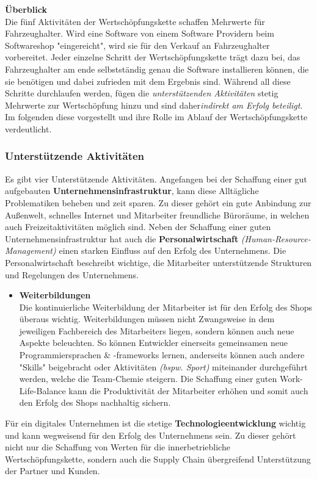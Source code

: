 \textbf{Überblick}\\
Die fünf Aktivitäten der Wertschöpfungskette schaffen Mehrwerte für Fahrzeughalter. Wird eine Software von einem Software Providern beim Softwareshop "eingereicht", wird sie für den Verkauf an Fahrzeughalter vorbereitet. Jeder einzelne Schritt der Wertschöpfungskette trägt dazu bei, das Fahrzeughalter am ende selbstständig genau die Software installieren können, die sie benötigen und dabei zufrieden mit dem Ergebnis sind. Während all diese Schritte durchlaufen werden, fügen die \textit{unterstützenden Aktivitäten} stetig Mehrwerte zur Wertschöpfung hinzu und sind daher\textit{indirekt am Erfolg beteiligt}. Im folgenden diese vorgestellt und ihre Rolle im Ablauf der Wertschöpfungskette verdeutlicht.

\subsubsection{Unterstützende Aktivitäten}\label{unterstd_activities}
Es gibt vier Unterstützende Aktivitäten. Angefangen bei der Schaffung einer gut aufgebauten \textbf{Unternehmensinfrastruktur}, kann diese Alltägliche Problematiken beheben und zeit sparen. Zu dieser gehört ein gute Anbindung zur Außenwelt, schnelles Internet und Mitarbeiter freundliche Büroräume, in welchen auch Freizeitaktivitäten möglich sind. Neben der Schaffung einer guten Unternehmensinfrastruktur hat auch die \textbf{Personalwirtschaft} \textit{(Human-Resource-Management)} einen starken Einfluss auf den Erfolg des Unternehmens. Die Personalwirtschaft beschreibt wichtige, die Mitarbeiter unterstützende Strukturen und Regelungen des Unternehmens.
\begin{itemize}
	\item[] \hspace{-0.6cm} \textbf{Weiterbildungen}\\
	Die kontinuierliche Weiterbildung der Mitarbeiter ist für den Erfolg des Shops überaus wichtig. Weiterbildungen müssen nicht Zwangsweise in dem jeweiligen Fachbereich des Mitarbeiters liegen, sondern können auch neue Aspekte beleuchten. So können Entwickler einerseits gemeinsamen neue Programmiersprachen \& -frameworks lernen, anderseits können auch andere "Skills" beigebracht oder Aktivitäten \textit{(bspw. Sport)} miteinander durchgeführt werden, welche die Team-Chemie steigern. Die Schaffung einer guten Work-Life-Balance kann die Produktivität der Mitarbeiter erhöhen\cite{wlb} und somit auch den Erfolg des Shops nachhaltig sichern.
	
\end{itemize}
Für ein digitales Unternehmen ist die stetige \textbf{Technologieentwicklung} wichtig und kann wegweisend für den Erfolg des Unternehmens sein. Zu dieser gehört nicht nur die Schaffung von Werten für die innerbetriebliche Wertschöpfungskette, sondern auch die Supply Chain übergreifend Unterstützung der Partner und Kunden.

